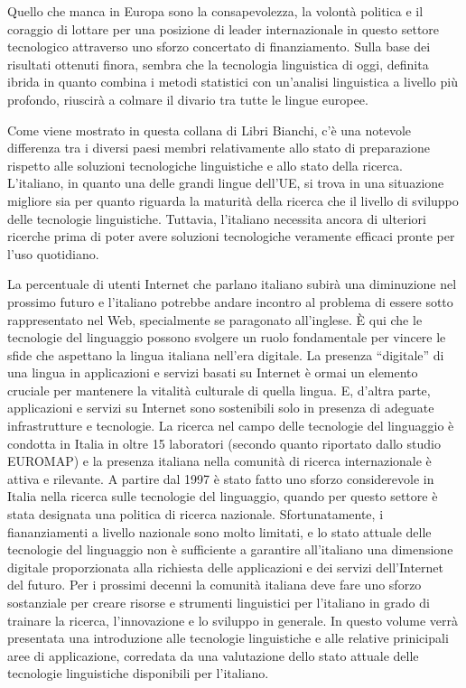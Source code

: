 \begin{multicols}{2}
Quello che manca in Europa sono la consapevolezza, la volont\`{a} politica e il coraggio di lottare per una posizione di leader internazionale in questo settore tecnologico attraverso uno sforzo concertato di finanziamento.  Sulla base dei risultati ottenuti finora, sembra che la tecnologia linguistica di oggi, definita ibrida in quanto combina i metodi statistici con un'analisi linguistica a livello pi\`{u} profondo, riuscir\`{a} a colmare il divario tra tutte le lingue europee.

Come viene mostrato in questa collana di Libri Bianchi, c'\`{e} una notevole differenza tra i diversi paesi membri relativamente allo stato di preparazione rispetto alle soluzioni tecnologiche linguistiche e allo stato della ricerca. L'italiano, in quanto una delle grandi lingue dell'UE, si trova in una situazione migliore sia per quanto riguarda la maturit\`{a} della ricerca che il livello di sviluppo delle tecnologie linguistiche. Tuttavia, l'italiano necessita ancora di ulteriori ricerche prima di poter avere soluzioni tecnologiche veramente efficaci pronte per l'uso quotidiano.

La percentuale di utenti Internet che parlano italiano subir\`{a} una diminuzione nel prossimo futuro e l'italiano potrebbe andare incontro al problema di essere sotto rappresentato nel Web, specialmente se paragonato all'inglese. \`{E} qui che le tecnologie del linguaggio possono svolgere un ruolo fondamentale per vincere le sfide che aspettano la lingua italiana nell'era digitale.  La presenza “digitale” di una lingua in applicazioni e servizi basati su Internet \`{e} ormai un elemento cruciale per mantenere la vitalit\`{a} culturale di quella lingua. E, d'altra parte, applicazioni e servizi su Internet sono sostenibili solo in presenza di adeguate infrastrutture e tecnologie.  La ricerca nel campo delle tecnologie del linguaggio \`{e} condotta in Italia in oltre 15 laboratori (secondo quanto riportato dallo studio EUROMAP) e la presenza italiana nella comunit\`{a} di ricerca internazionale \`{e} attiva e rilevante.  A partire dal 1997 \`{e} stato fatto uno sforzo considerevole in Italia nella ricerca sulle tecnologie del linguaggio, quando per questo settore \`{e} stata designata una politica di ricerca nazionale. Sfortunatamente, i fiananziamenti a livello nazionale sono molto limitati, e lo stato attuale delle tecnologie del linguaggio non \`{e} sufficiente a garantire all'italiano una dimensione digitale proporzionata alla richiesta delle applicazioni e dei servizi dell'Internet del futuro.  Per i prossimi decenni la comunit\`{a} italiana deve fare uno sforzo sostanziale per creare risorse e strumenti linguistici per l'italiano in grado di trainare la ricerca, l'innovazione e lo sviluppo in generale.  In questo volume verr\`{a} presentata una introduzione alle tecnologie linguistiche e alle relative prinicipali aree di applicazione, corredata da una valutazione dello stato attuale delle tecnologie linguistiche disponibili per l'italiano.


\end{multicols}
